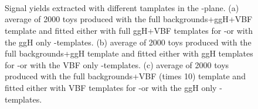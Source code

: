 \begin{figure}[tb]
\centering
{}\\
\\
\\
\caption{Signal yields extracted with different tamplates in the \mll-\mt plane. (a) average of 2000 toys produced with the full backgrounds+ggH+VBF template and fitted either with full ggH+VBF templates for \mll-\mt or with the ggH only \mll-\mt templates. (b) average of 2000 toys produced with the full backgrounds+ggH template and fitted either with ggH templates for \mll-\mt or with the VBF only \mll-\mt templates. (c) average of 2000 toys produced with the full backgrounds+VBF (times 10) template and fitted either with VBF templates for \mll-\mt or with the ggH only \mll-\mt templates. \label{fig:templates_tests}}
\end{figure}



